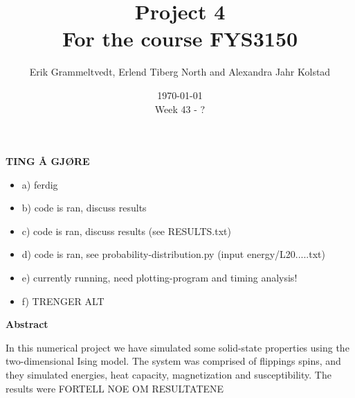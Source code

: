 \documentclass{article}
\begin{document}
\addtocounter{page}{0}

\title{Project 4 \\
      \large For the course FYS3150}
\date{\today \\
    \vspace{1mm}
    \large Week 43 - ?}

\author{Erik Grammeltvedt, Erlend Tiberg North and Alexandra Jahr Kolstad}

\maketitle




\textbf{TING Å GJØRE}
\begin{itemize}
  \item a) ferdig
  \item b) code is ran, discuss results
  \item c) code is ran, discuss results (see RESULTS.txt)
  \item d) code is ran, see probability-distribution.py (input energy/L20.....txt)
  \item e) currently running, need plotting-program and timing analysis!
  \item f) TRENGER ALT
\end{itemize}

\vspace{1cm}


\begin{center}

{\Large\textbf{Abstract}} \label{sec:Abstract}

\end{center}

In this numerical project we have simulated some solid-state properties using the two-dimensional Ising model. The system was comprised of flippings spins, and they simulated energies, heat capacity, magnetization and susceptibility.
The results were FORTELL NOE OM RESULTATENE

\newpage

\end{document}

